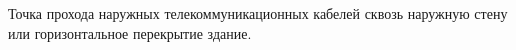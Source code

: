 Точка прохода наружных телекоммуникационных кабелей
сквозь наружную стену или горизонтальное перекрытие здание.